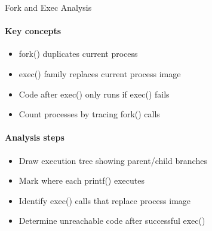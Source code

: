\begin{KR}{Fork and Exec Analysis}
    \paragraph{Key concepts}
    \begin{itemize}
        \item fork() duplicates current process
        \item exec() family replaces current process image
        \item Code after exec() only runs if exec() fails
        \item Count processes by tracing fork() calls
    \end{itemize}
    
    \paragraph{Analysis steps}
    \begin{itemize}
        \item Draw execution tree showing parent/child branches
        \item Mark where each printf() executes
        \item Identify exec() calls that replace process image
        \item Determine unreachable code after successful exec()
    \end{itemize}
\end{KR}

